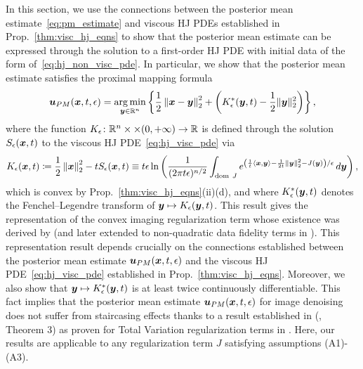 In this section, we use the connections between the posterior mean estimate~\eqref{eq:pm_estimate} and viscous HJ PDEs established in Prop.~\ref{thm:visc_hj_eqns} to show that the posterior mean estimate can be expressed through the solution to a first-order HJ PDE with initial data of the form of~\eqref{eq:hj_non_visc_pde}. In particular, we show that the posterior mean estimate satisfies the proximal mapping formula
\begin{equation*}
\boldsymbol{u}_{PM}(\boldsymbol{x},t,\epsilon) = \operatorname*{arg\,min}_{\boldsymbol{y}\in\mathbb{R}^n}\left\{ \frac{1}{2}\left\Vert \boldsymbol{x}-\boldsymbol{y}\right\Vert _{2}^{2} + \left(K^{*}_{\epsilon}(\boldsymbol{y},t)-\frac{1}{2}\Vert \boldsymbol{y} \Vert_{2}^{2}\right)\right\},
\end{equation*}
where the function $K_\epsilon\colon\mathbb{R}^n\times\times(0,+\infty) \to \mathbb{R}$ is defined through the solution $S_\epsilon(\boldsymbol{x},t)$ to the viscous HJ PDE~\eqref{eq:hj_visc_pde} via
\begin{equation*}
K_{\epsilon}(\boldsymbol{x},t) \coloneqq \frac{1}{2}\left\Vert \boldsymbol{x}\right\Vert _{2}^{2}-tS_{\epsilon}(\boldsymbol{x},t) \equiv t\epsilon\ln\left(\frac{1}{(2\pi t\epsilon)^{n/2}}\int_{\mathrm{dom~} J}e^{\left(\frac{1}{t}\left\langle \boldsymbol{x},\boldsymbol{y}\right\rangle -\frac{1}{2t}\left\Vert \boldsymbol{y}\right\Vert _{2}^{2}-J(\boldsymbol{y})\right)/\epsilon}\mathop{}\!d\boldsymbol{y}\right),
\end{equation*}
which is convex by Prop.~\ref{thm:visc_hj_eqns}(ii)(d), and where $K^{*}_{\epsilon}(\boldsymbol{y},t)$ denotes the Fenchel--Legendre transform of $\boldsymbol{y} \mapsto K_\epsilon(\boldsymbol{y},t)$. This result gives the representation of the convex imaging regularization term whose existence was derived by \cite{louchet2008modeles,gribonval2011should,gribonval2013reconciling,louchet2013posterior} (and later extended to non-quadratic data fidelity terms in \cite{gribonval2018characterization,gribonval2018bayesian}). This representation result depends crucially on the connections established between the posterior mean estimate $\boldsymbol{u}_{PM}(\boldsymbol{x},t,\epsilon)$ and the viscous HJ PDE~\eqref{eq:hj_visc_pde} established in Prop.~\ref{thm:visc_hj_eqns}. Moreover, we also show that $\boldsymbol{y} \mapsto K^{*}_{\epsilon}(\boldsymbol{y},t)$ is at least twice continuously differentiable. This fact implies that the posterior mean estimate $\boldsymbol{u}_{PM}(\boldsymbol{x},t,\epsilon)$ for image denoising does not suffer from staircasing effects thanks to a result established in (\cite{nikolova2004weakly}, Theorem 3) as proven for Total Variation regularization terms in \cite{louchet2008modeles}. Here, our results are applicable to any regularization term $J$ satisfying assumptions (A1)-(A3).

